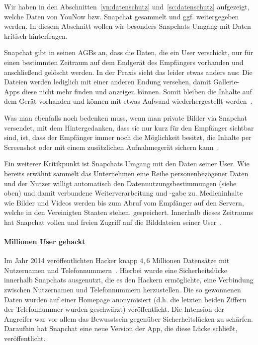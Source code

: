 Wir haben in den Abschnitten~\ref{yn:datenschutz} und~\ref{sc:datenschutz}
aufgezeigt, welche Daten von YouNow bzw. Snapchat gesammelt und ggf.
weitergegeben werden. In diesem Abschnitt wollen wir besonders Snapchats Umgang
mit Daten kritisch hinterfragen.

Snapchat gibt in seinen AGBs an, dass die Daten, die ein User verschickt, nur
f\"ur einen bestimmten Zeitraum auf dem Endger\"at des Empf\"angers vorhanden
und anschlie{\ss}end gel\"oscht werden. In der Praxis sieht das leider etwas
anders aus: Die Dateien werden lediglich mit einer anderen Endung versehen,
damit Gallerie-Apps diese nicht mehr finden und anzeigen k\"onnen. Somit
bleiben die Inhalte auf dem Ger\"at vorhanden und k\"onnen mit etwas Aufwand
wiederhergestellt werden~\cite{sc_risiken}.

Was man ebenfalls noch bedenken muss, wenn man private Bilder via Snapchat
versendet, mit dem Hintergedanken, dass sie nur kurz f\"ur den Empf\"anger
sichtbar sind, ist, dass der Empf\"anger immer noch die M\"oglichkeit besitzt,
die Inhalte per Screenshot oder mit einem zus\"atzlichen Aufnahmeger\"at
sichern kann~\cite{sc_risiken}.

Ein weiterer Kritikpunkt ist Snapchats Umgang mit den Daten seiner User. Wie
bereits erw\"ahnt sammelt das Unternehmen eine Reihe personenbezogener Daten
und der Nutzer willigt automatisch den Datennutzungsbestimmungen (siehe oben)
und damit verbundene Weiterverarbeitung und -gabe zu. Medieninhalte wie Bilder
und Videos werden bis zum Abruf vom Empf\"anger auf den Servern, welche in den
Vereinigten Staaten stehen, gespeichert. Innerhalb dieses Zeitraums hat
Snapchat vollen und freien Zugriff auf die Bilddateien seiner
User~\cite{sc_risiken}.

\paragraph{Millionen User gehackt} Im Jahr 2014 ver\"offentlichten Hacker knapp
$4,6$ Millionen Datens\"atze mit Nutzernamen und Telefonnummern~\cite{sc_hack}.
Hierbei wurde eine Sicherheitsl\"ucke innerhalb Snapchats ausgenutzt, die es
den Hackern erm\"oglichte, eine Verbindung zwischen Nutzernamen und
Telefonnummern herzustellen. Die so gewonnenen Daten wurden auf einer Homepage
anonymisiert (d.h. die letzten beiden Ziffern der Telefonnummer wurden
geschw\"arzt) ver\"offentlicht. Die Intension der Angreifer war vor allem das
Bewusstsein gegen\"uber Sicherheitsl\"ucken zu sch\"arfen. Daraufhin hat
Snapchat eine neue Version der App, die diese L\"ucke schlie{\ss}t,
ver\"offentlicht.

